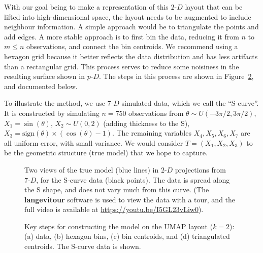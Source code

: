 \documentclass[
  12pt]{article}
\newcommand\pD{$p\text{-}D$}
\newcommand\gD{$2\text{-}D$}
\begin{document}
With our goal being to make a representation of this \gD{} layout that
can be lifted into high-dimensional space, the layout needs to be
augmented to include neighbour information. A simple approach would be
to triangulate the points and add edges. A more stable approach is to
first bin the data, reducing it from \(n\) to \(m\leq n\) observations,
and connect the bin centroids. We recommend using a hexagon grid because
it better reflects the data distribution and has less artifacts than a
rectangular grid. This process serves to reduce some noisiness in the
resulting surface shown in \pD{}. The steps in this process are shown in
Figure~\ref{fig-NLDR-scurve}, and documented below.

To illustrate the method, we use \(7\text{-}D\) simulated data, which we
call the ``S-curve''. It is constructed by simulating \(n=750\)
observations from \(\theta \sim U(-3\pi/2, 3\pi/2)\),
\(X_1 = \sin(\theta)\), \(X_2 \sim U(0, 2)\) (adding thickness to the
S), \(X_3 = \text{sign}(\theta) \times (\cos(\theta) - 1)\). The
remaining variables \(X_4, X_5, X_6, X_7\) are all uniform error, with
small variance. We would consider \(T=(X_1, X_2, X_3)\) to be the
geometric structure (true model) that we hope to capture.

\begin{figure}[H]


\caption{\label{fig-scurve-true-sc}Two views of the true model (blue
lines) in \(2\text{-}D\) projections from \(7\text{-}D\), for the
S-curve data (black points). The data is spread along the S shape, and
does not vary much from this curve. (The \textbf{langevitour} software
is used to view the data with a tour, and the full video is available at
\url{https://youtu.be/I5GL23vLiw0}).}

\end{figure}%

\begin{figure}


\caption{\label{fig-NLDR-scurve}Key steps for constructing the model on
the UMAP layout (\(k=2\)): (a) data, (b) hexagon bins, (c) bin
centroids, and (d) triangulated centroids. The S-curve data is shown.}

\end{figure}%
\end{document}
